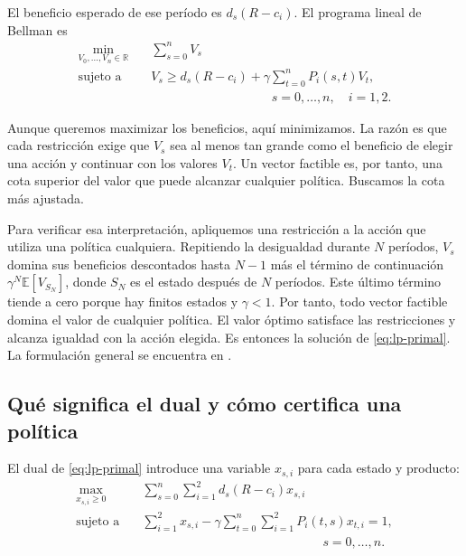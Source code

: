\documentclass[11pt,a4paper]{article}
\begin{document}
El beneficio esperado de ese período es $d_s(R-c_i)$. El programa lineal
de Bellman es
\begin{equation}
\begin{aligned}
\min_{V_0,\ldots,V_n\in\mathbb R}\quad
    &\sum_{s=0}^{n}V_s\\
\text{sujeto a}\quad
    &V_s\ge d_s(R-c_i)+\gamma\sum_{t=0}^{n}P_i(s,t)V_t,\\
    &\hspace{4cm}s=0,\ldots,n,\quad i=1,2.
\end{aligned}
\label{eq:lp-primal}
\end{equation}

Aunque queremos maximizar los beneficios, aquí minimizamos. La razón es
que cada restricción exige que $V_s$ sea al menos tan grande como el
beneficio de elegir una acción y continuar con los valores $V_t$.
Un vector factible es, por tanto, una cota superior del valor que puede
alcanzar cualquier política. Buscamos la cota más ajustada.

Para verificar esa interpretación, apliquemos una restricción a la
acción que utiliza una política cualquiera. Repitiendo la desigualdad
durante $N$ períodos, $V_s$ domina sus beneficios descontados hasta
$N-1$ más el término de continuación
$\gamma^N\mathbb E[V_{S_N}]$, donde $S_N$ es el estado después de
$N$ períodos. Este último término tiende a cero porque hay
finitos estados y $\gamma<1$. Por tanto, todo vector factible domina
el valor de cualquier política. El valor óptimo satisface las
restricciones y alcanza igualdad con la acción elegida. Es entonces
la solución de \eqref{eq:lp-primal}. La formulación general se encuentra
en \cite{ying-zhu2020}.

\subsection{Qué significa el dual y cómo certifica una política}

El dual de \eqref{eq:lp-primal} introduce una variable $x_{s,i}$ para
cada estado y producto:
\begin{equation}
\begin{aligned}
\max_{x_{s,i}\ge0}\quad
    &\sum_{s=0}^{n}\sum_{i=1}^{2}d_s(R-c_i)x_{s,i}\\
\text{sujeto a}\quad
    &\sum_{i=1}^{2}x_{s,i}
      -\gamma\sum_{t=0}^{n}\sum_{i=1}^{2}P_i(t,s)x_{t,i}=1,\\
    &\hspace{6cm}s=0,\ldots,n.
\end{aligned}
\label{eq:lp-dual}
\end{equation}
\end{document}
